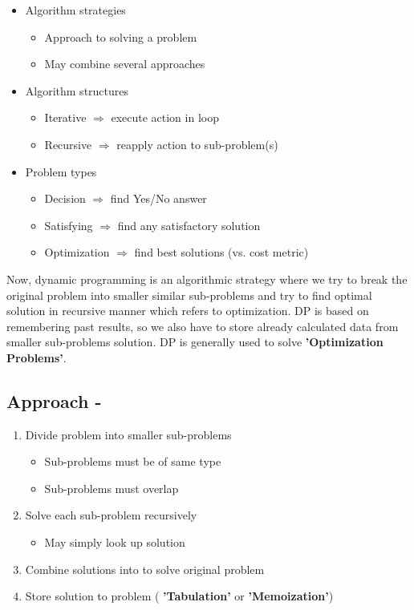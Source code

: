\documentclass[12pt]{article}
\begin{document}
\begin{itemize}[label=$\diamond$]
\item Algorithm strategies
\begin{itemize}
\item Approach to solving a problem
\item May combine several approaches
\end{itemize}
\item Algorithm structures
\begin{itemize}
\item Iterative $\Rightarrow $ execute action in loop
\item Recursive  $\Rightarrow$ reapply action to sub-problem(s)
\end{itemize}
\item Problem types
\begin{itemize}
\item Decision $\Rightarrow$ find Yes/No answer
\item Satisfying $\Rightarrow$ find any satisfactory solution
\item Optimization $\Rightarrow$ find best solutions (vs. cost metric)
\end{itemize}
\end{itemize}
Now, dynamic programming is an algorithmic strategy where we try to break the original problem into smaller similar sub-problems and try to find optimal solution in recursive manner which refers to optimization. DP is based on remembering past results, so we also have to store already calculated data from smaller sub-problems solution. DP is generally used to solve \textbf{'Optimization Problems'}.
\newline 

\subsection{Approach -}
\begin{enumerate}[label=(\roman*)]
\item Divide problem into smaller sub-problems 
\begin{itemize}
\item Sub-problems must be of same type
\item Sub-problems must overlap
\end{itemize}
\item Solve each sub-problem recursively
\begin{itemize}
\item May simply look up solution
\end{itemize}
\item Combine solutions into to solve original problem
\item Store solution to problem ( \textbf{'Tabulation'}  or \textbf{'Memoization'})
\end{enumerate}
\vspace{3mm} 
\end{document}
